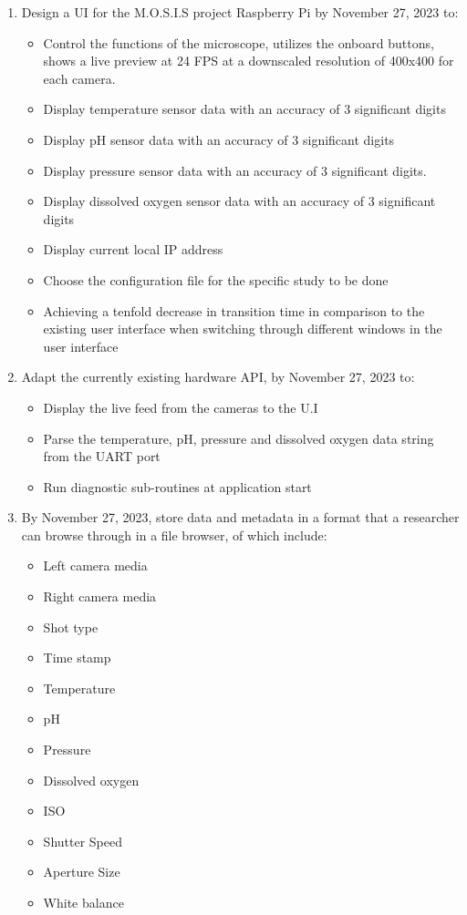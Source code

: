 \begin{enumerate}
	\item Design a UI for the M.O.S.I.S project Raspberry Pi by November 27, 2023 to:
	      \begin{itemize}
		      \item Control the functions of the microscope, utilizes the onboard buttons, shows a live preview at 24 FPS at a downscaled resolution of 400x400 for each camera.
		      \item Display temperature sensor data with an accuracy of 3 significant digits
		      \item Display pH sensor data with an accuracy of 3 significant digits
		      \item Display pressure sensor data with an accuracy of 3 significant digits.
		      \item Display dissolved oxygen sensor data with an accuracy of 3 significant digits
		      \item Display current local IP address
		      \item Choose the configuration file for the specific study to be done
		      \item Achieving a tenfold decrease in transition time in comparison to the existing user interface when switching through different windows in the user interface
	      \end{itemize}
	\item Adapt the currently existing hardware API, by November 27, 2023 to:
	      \begin{itemize}
		      \item Display the live feed from the cameras to the U.I
		      \item Parse the temperature, pH, pressure and dissolved oxygen data string from the UART port
		      \item Run diagnostic sub-routines at application start
	      \end{itemize}
	\item By November 27, 2023, store data and metadata in a format that a researcher can browse through in a file browser, of which include:
	      \begin{itemize}
		      \item Left camera media
		      \item Right camera media
		      \item Shot type
		      \item Time stamp
		      \item Temperature
		      \item pH
		      \item Pressure
		      \item Dissolved oxygen
                      \item ISO
                      \item Shutter Speed
                      \item Aperture Size
                      \item White balance
	      \end{itemize}
\end{enumerate}
